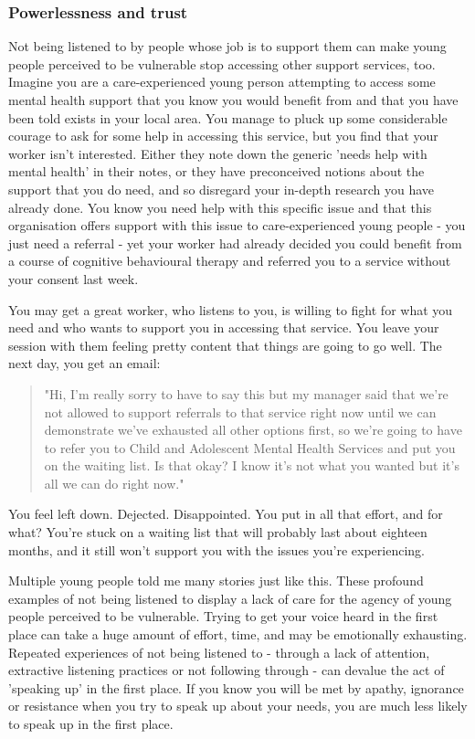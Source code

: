 \subsubsection{Powerlessness and trust}
Not being listened to by people whose job is to support them can make young people perceived to be vulnerable stop accessing other support services, too. Imagine you are a care-experienced young person attempting to access some mental health support that you know you would benefit from and that you have been told exists in your local area. You manage to pluck up some considerable courage to ask for some help in accessing this service, but you find that your worker isn't interested. Either they note down the generic 'needs help with mental health' in their notes, or they have preconceived notions about the support that you do need, and so disregard your in-depth research you have already done. You know you need help with this specific issue and that this organisation offers support with this issue to care-experienced young people - you just need a referral - yet your worker had already decided you could benefit from a course of cognitive behavioural therapy and referred you to a service without your consent last week.

You may get a great worker, who listens to you, is willing to fight for what you need and who wants to support you in accessing that service. You leave your session with them feeling pretty content that things are going to go well. The next day, you get an email:
\begin{quote}
"Hi, I'm really sorry to have to say this but my manager said that we’re not allowed to support referrals to that service right now until we can demonstrate we’ve exhausted all other options first, so we’re going to have to refer you to Child and Adolescent Mental Health Services and put you on the waiting list. Is that okay? I know it's not what you wanted but it's all we can do right now."
\end{quote}
You feel left down. Dejected. Disappointed. You put in all that effort, and for what? You’re stuck on a waiting list that will probably last about eighteen months, and it still won’t support you with the issues you’re experiencing. 

Multiple young people told me many stories just like this. These profound examples of not being listened to display a lack of care for the agency of young people perceived to be vulnerable. Trying to get your voice heard in the first place can take a huge amount of effort, time, and may be emotionally exhausting. Repeated experiences of not being listened to - through a lack of attention, extractive listening practices or not following through - can devalue the act of 'speaking up' in the first place. If you know you will be met by apathy, ignorance or resistance when you try to speak up about your needs, you are much less likely to speak up in the first place.

